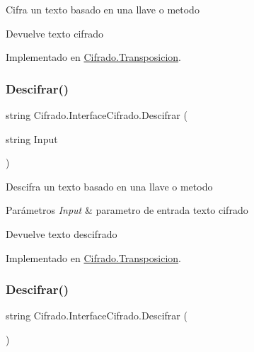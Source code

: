 Cifra un texto basado en una llave o metodo 

\begin{DoxyReturn}{Devuelve}
texto cifrado
\end{DoxyReturn}


Implementado en \hyperlink{class_cifrado_1_1_transposicion_a3d6021ac06c306a6943e88c3678d97cf}{Cifrado.\+Transposicion}.

\mbox{\label{interface_cifrado_1_1_interface_cifrado_af7035203a5d4212ddcca039351dd3a22}} 
\subsubsection{\texorpdfstring{Descifrar()}{Descifrar()}\hspace{0.1cm}{\footnotesize\ttfamily [1/2]}}
{\footnotesize\ttfamily string Cifrado.\+Interface\+Cifrado.\+Descifrar (\begin{DoxyParamCaption}\item[{string}]{Input }\end{DoxyParamCaption})}



Descifra un texto basado en una llave o metodo 


\begin{DoxyParams}{Parámetros}
{\em Input} & parametro de entrada texto cifrado\\
\hline
\end{DoxyParams}
\begin{DoxyReturn}{Devuelve}
texto descifrado
\end{DoxyReturn}


Implementado en \hyperlink{class_cifrado_1_1_transposicion_a45a8f6d97d2afdf5691c7197ae0187c4}{Cifrado.\+Transposicion}.

\mbox{\label{interface_cifrado_1_1_interface_cifrado_aef07884028ee90698a4a1202d851fecf}} 
\subsubsection{\texorpdfstring{Descifrar()}{Descifrar()}\hspace{0.1cm}{\footnotesize\ttfamily [2/2]}}
{\footnotesize\ttfamily string Cifrado.\+Interface\+Cifrado.\+Descifrar (\begin{DoxyParamCaption}{ }\end{DoxyParamCaption})}



